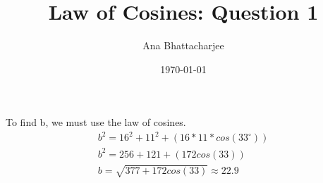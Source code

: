 \documentclass{article}
\begin{document}
\title{Law of Cosines: Question 1}
\author{Ana Bhattacharjee}
\date{\today}

\begin{center}
To find b, we must use the law of cosines.
\begin{align}
  b^2 = 16^2 + 11^2 + (16*11*cos(33^{\circ})) \\
  b^2 = 256 + 121 + (172cos(33)) \\
  b = \sqrt{377 + 172cos(33)} \approx 22.9 
\end{align}
\end{center}
\end{document}
